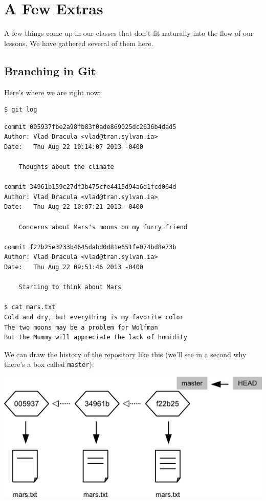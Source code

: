 \documentclass{book}
\begin{document}
\chapter{A Few Extras}\label{s:extras}

A few things come up in our classes that don't fit naturally into the
flow of our lessons. We have gathered several of them here.

\section{Branching in Git}

Here's where we are right now:

\begin{verbatim}
$ git log
\end{verbatim}

\begin{verbatim}
commit 005937fbe2a98fb83f0ade869025dc2636b4dad5
Author: Vlad Dracula <vlad@tran.sylvan.ia>
Date:   Thu Aug 22 10:14:07 2013 -0400

    Thoughts about the climate

commit 34961b159c27df3b475cfe4415d94a6d1fcd064d
Author: Vlad Dracula <vlad@tran.sylvan.ia>
Date:   Thu Aug 22 10:07:21 2013 -0400

    Concerns about Mars's moons on my furry friend

commit f22b25e3233b4645dabd0d81e651fe074bd8e73b
Author: Vlad Dracula <vlad@tran.sylvan.ia>
Date:   Thu Aug 22 09:51:46 2013 -0400

    Starting to think about Mars

$ cat mars.txt
Cold and dry, but everything is my favorite color
The two moons may be a problem for Wolfman
But the Mummy will appreciate the lack of humidity
\end{verbatim}

We can draw the history of the repository like this (we'll see in a
second why there's a box called \texttt{master}):

\includegraphics{novice/extras/img/git-branching-01.png}
\end{document}
